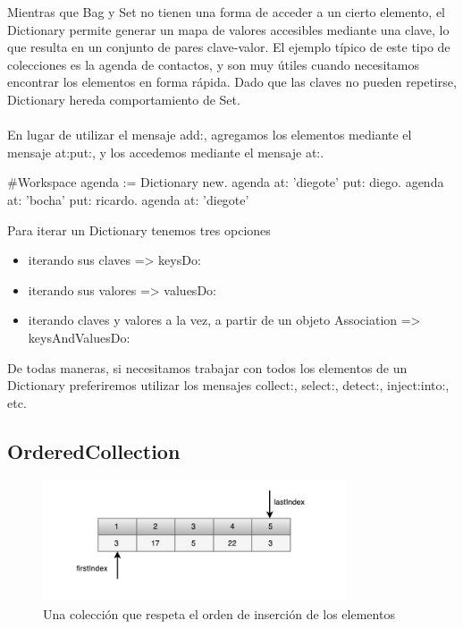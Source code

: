 \documentclass[a4paper,12pt]{book}
\begin{document}
Mientras que Bag y Set no tienen una forma de acceder a un cierto elemento, el Dictionary permite generar un
mapa de valores accesibles mediante una clave, lo que resulta en un conjunto de pares clave-valor. El ejemplo
típico de este tipo de colecciones es la agenda de contactos, y son muy útiles cuando necesitamos
encontrar los elementos en forma rápida. Dado que las claves no pueden repetirse, Dictionary hereda
comportamiento de Set. 
\\
\\
En lugar de utilizar el mensaje add:, agregamos los elementos mediante el mensaje at:put:, y los accedemos
mediante el mensaje at:.

\begin{code}
#Workspace
agenda := Dictionary new.
agenda at: 'diegote' put: diego.
agenda at: 'bocha' put: ricardo.
agenda at: 'diegote'
\end{code}

Para iterar un Dictionary tenemos tres opciones

\begin{itemize}
 \item iterando sus claves => keysDo:
 \item iterando sus valores => valuesDo:
 \item iterando claves y valores a la vez, a partir de un objeto Association => \newline 
 keysAndValuesDo:
\end{itemize}

De todas maneras, si necesitamos trabajar con todos los elementos de un Dictionary preferiremos utilizar
los mensajes collect:, select:, detect:, inject:into:, etc.

\subsection{OrderedCollection}

\begin{figure}[h!]
    \centering
    \includegraphics[width=0.8\textwidth]{images/40_OrderedCollection.pdf}
    \caption{Una colección que respeta el orden de inserción de los elementos}
\end{figure}
\FloatBarrier
\end{document}
